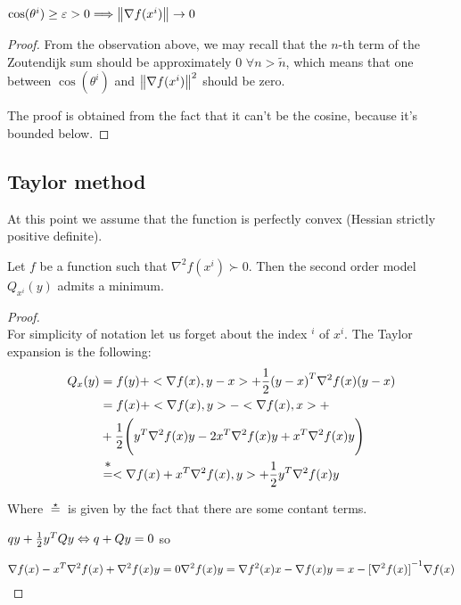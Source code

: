 \documentclass[ComputationalMathematics.tex]{subfiles}
\begin{document}
\begin{proposition}
  $\cos(\theta^i) \geq \varepsilon > 0 \Longrightarrow \left\lVert\nabla f(x^i)\right\rVert \to 0$
\end{proposition}
\begin{proof}
  From the observation above, we may recall that the $n$-th term of the Zoutendijk sum should be approximately $0$ $\forall n > \widetilde{n}$, which means that one between $\cos(\theta^i)$ and ${\left\lVert\nabla f(x^i)\right\rVert}^2$ should be zero.

  The proof is obtained from the fact that it can't be the cosine, because it's bounded below.
\end{proof}

\subsection{Taylor method}

At this point we assume that the function is perfectly convex (Hessian strictly positive definite).

\begin{theorem}
Let $f$ be a function such that $\nabla^2 f(x^i) {\succ} 0$. Then the second order model $Q_{x^i}(y)$ admits a minimum.
\end{theorem}
\begin{proof}~\\
For simplicity of notation let us forget about the index $^i$ of $x^i$. The Taylor expansion is the following:
  \begin{equation}
    \begin{aligned}
      Q_x(y) &= f(y) + <\nabla f(x), y-x> + \frac{1}{2} \tr{(y-x)} \nabla^2 f(x) (y-x)\\
      &= f(x) + <\nabla f(x), y> - <\nabla f(x), x> +\\
      &+ \frac{1}{2} \Biggl(\tr{y} \nabla^2 f(x) y - 2 \tr{x} \nabla^2 f(x) y + \tr{x} \nabla^2 f(x) y \Biggr)\\
      &\stareq <\nabla f(x) + \tr{x} \nabla^2 f(x), y> + \frac{1}{2} \tr{y} \nabla^2 f(x) y
    \end{aligned}
  \end{equation}

Where $\stareq$ is given by the fact that there are some contant terms.

$qy + \frac{1}{2} {y}^{T} Q y \Leftrightarrow q+Qy = 0$ so

\[
  \nabla f(x) - {x}^{T} \nabla^2 f(x) + \nabla^2 f(x) y = 0\\
  \nabla^2 f(x) y = \nabla f^2(x)x - \nabla f(x)\\
  y = x - {[\nabla^2 f(x)]}^{-1} \nabla f(x)
\]
\end{proof}
\end{document}
